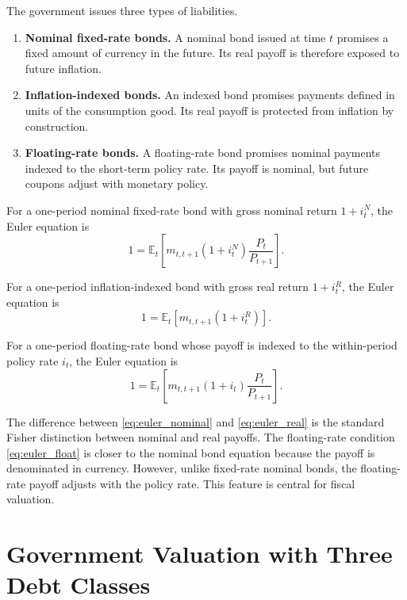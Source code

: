 \documentclass[12pt,a4paper]{article}
\begin{document}
The government issues three types of liabilities.

\begin{enumerate}
\item \textbf{Nominal fixed-rate bonds.} A nominal bond issued at time $t$ promises
a fixed amount of currency in the future. Its real payoff is therefore exposed to
future inflation.


\item \textbf{Inflation-indexed bonds.} An indexed bond promises payments defined
in units of the consumption good. Its real payoff is protected from inflation by
construction.

\item \textbf{Floating-rate bonds.} A floating-rate bond promises nominal payments
indexed to the short-term policy rate. Its payoff is nominal, but future coupons
adjust with monetary policy.


\end{enumerate}

For a one-period nominal fixed-rate bond with gross nominal return $1+i_t^N$, the Euler
equation is
\begin{equation}
1=\mathbb{E}_t
\left[
m_{t,t+1}
(1+i_t^N)
\frac{P_t}{P_{t+1}}
\right].
\label{eq:euler_nominal}
\end{equation}

For a one-period inflation-indexed bond with gross real return $1+i_t^R$, the Euler
equation is
\begin{equation}
1=\mathbb{E}_t
\left[
m_{t,t+1}
(1+i_t^R)
\right].
\label{eq:euler_real}
\end{equation}

For a one-period floating-rate bond whose payoff is indexed to the within-period policy
rate $i_t$, the Euler equation is
\begin{equation}
1=\mathbb{E}_t
\left[
m_{t,t+1}
(1+i_t)
\frac{P_t}{P_{t+1}}
\right].
\label{eq:euler_float}
\end{equation}

The difference between \eqref{eq:euler_nominal} and \eqref{eq:euler_real} is the
standard Fisher distinction between nominal and real payoffs. The floating-rate
condition \eqref{eq:euler_float} is closer to the nominal bond equation because the
payoff is denominated in currency. However, unlike fixed-rate nominal bonds, the
floating-rate payoff adjusts with the policy rate. This feature is central for fiscal
valuation.

\section{Government Valuation with Three Debt Classes}
\end{document}
